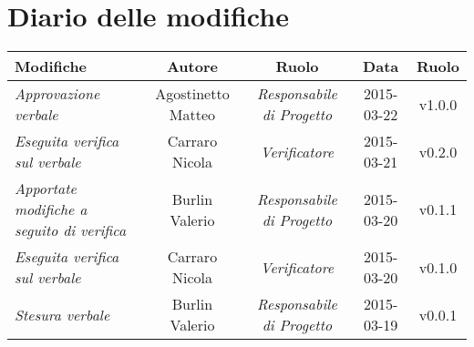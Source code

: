 \newpage
\section*{Diario delle modifiche}

\begin{table}[h]
\centering
\begin{tabular}{|p{}|c|c|c|c|}
	\toprule
		\textbf{Modifiche} & \textbf{Autore} & \textbf{Ruolo} & \textbf{Data} & \textbf{Ruolo} \\
	\midrule
	\midrule
		\textit{Approvazione verbale} & Agostinetto Matteo & \textit{Responsabile di Progetto} & 2015-03-22 & v1.0.0 \\									
	\midrule
		\textit{Eseguita verifica sul verbale} & Carraro Nicola & \textit{Verificatore} & 2015-03-21 & v0.2.0 \\
	\midrule
		\textit{Apportate modifiche a seguito di verifica} & Burlin Valerio & \textit{Responsabile di Progetto} & 2015-03-20 & v0.1.1 \\
	\midrule
		\textit{Eseguita verifica sul verbale} & Carraro Nicola & \textit{Verificatore} & 2015-03-20 & v0.1.0 \\ 
	\midrule
		\textit{Stesura verbale} & Burlin Valerio & \textit{Responsabile di Progetto} & 2015-03-19 & v0.0.1 \\
	\bottomrule
\end{tabular}	
\end{table}

\newpage